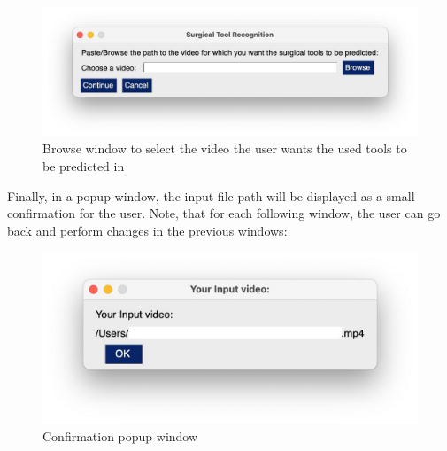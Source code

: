 \documentclass{article}
\begin{document}
\begin{figure}[H]
    \centering
    \includegraphics[width = \linewidth]{Browse_window.jpg}
    \caption{Browse window to select the video the user wants the used tools to be predicted in}
\end{figure}
\noindent
Finally, in a popup window, the input file path will be displayed as a small confirmation for the user. Note, that for each following window, the user can go back and perform changes in the previous windows:

\begin{figure}[H]
    \centering
    \includegraphics[width = \linewidth]{Confirm_window.jpg}
    \caption{Confirmation popup window}
\end{figure}
\noindent
\end{document}
